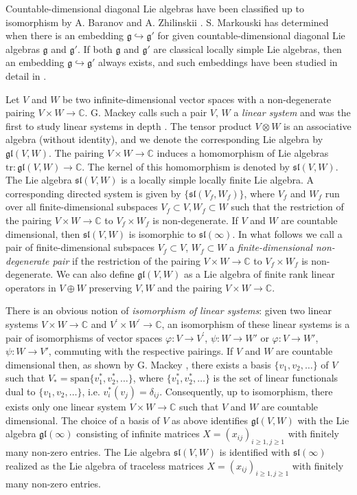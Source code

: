 \documentclass{svmult}
\newcommand {\CC} {\mathbb {C}}
\renewcommand{\sl}{\mathfrak{sl}}
\renewcommand{\gg}{\mathfrak{g}}
\renewcommand {\phi} {\varphi}
\renewcommand{\span}{\mathrm{span}}
\newcommand{\gl}{\mathfrak{gl}}
\begin{document}
Countable-dimensional diagonal Lie algebras have been classified up to
isomorphism by A. Baranov and A. Zhilinskii \cite{BZ}. S. Markouski
\cite{M} has determined when there is an embedding $\gg
\hookrightarrow \gg'$ for given countable-dimensional diagonal Lie
algebras $\gg$ and $\gg'$. If both $\gg$ and $\gg'$ are classical
locally simple Lie algebras, then an embedding 
$\gg \hookrightarrow \gg'$ always exists, and such embeddings have been studied in detail in \cite{dip2}.

Let $V$ and $W$ be two infinite-dimensional vector spaces with a non-degenerate pairing $V \times W \rightarrow \CC$. 
G. Mackey calls such a pair $V,\,W$ a \textit{linear system} and was the first to study linear systems in depth \cite{m}.
The tensor product $V\otimes W$ is an associative algebra (without
identity), and we denote the corresponding Lie algebra by 
$\gl(V,W)$.
The pairing $V\times W\to\CC$ induces a homomorphism of Lie algebras
$\mathrm{tr} : \gl(V,W)\to\CC$. The kernel of this homomorphism is
denoted by $\sl(V,W)$. The Lie algebra $\sl(V,W)$ is a locally simple
locally finite Lie algebra. A corresponding directed system is given
by $\{\sl(V_f,W_f)\}$, where $V_f$ and $W_f$ run over all
finite-dimensional subspaces $V_f\subset V, W_f\subset W$ such that
the restriction of the pairing $V \times W \rightarrow \CC$ to
$V_f\times W_f$ is non-degenerate. If $V$ and $W$ are countable
dimensional, then $\sl(V,W)$ is isomorphic to $\sl(\infty)$. In what
follows we call a pair of finite-dimensional subspaces $V_{f} \subset
V$, $W_{f} \subset W$ a \textit{finite-dimensional non-degenerate
  pair} if the restriction of the pairing $V \times W \rightarrow \CC$
to $V_{f} \times W_{f}$ is non-degenerate. We can also define 
$\gl(V,W)$ as a Lie algebra of finite rank linear operators in
$V\oplus W$ preserving $V,W$ and the pairing $V\times W\to\mathbb C$.

There is an obvious notion of \textit{isomorphism of linear systems}: given two linear systems $V \times W \rightarrow \CC$ and $V^{\prime} \times W^{\prime} \rightarrow \CC$, an isomorphism of these linear systems is a pair of isomorphisms of vector spaces $\phi : V \rightarrow V^{\prime}$, $\psi: W\rightarrow W'$ or $\phi: V \rightarrow W'$, $\psi : W \rightarrow V'$, commuting with the respective pairings. If $V$ and $W$ are countable dimensional then, as shown by G. Mackey \cite{M}, there exists a basis $\lbrace
v_1,v_2,\dots\rbrace$ of $V$ such that 
$V_* = \span \lbrace v^*_1, v^*_2, \dots\rbrace$, 
where $\lbrace v^*_1, v^*_2, \dots\rbrace$ is the set of linear
functionals dual to $\lbrace v_1,v_2,\dots\rbrace$, i.e. $v_i^*(v_j) =
\delta_{ij}$. Consequently, up to isomorphism, there exists only one linear system $V \times W \rightarrow \CC$ such that $V$ and $W$ are countable dimensional. The choice of a basis of $V$ as above identifies $\gl(V,W)$ with
the Lie algebra $\gl(\infty)$ consisting of infinite matrices
$X=(x_{ij})_{i\geq 1,j\geq 1}$ with finitely many non-zero
entries. The Lie algebra $\sl(V,W)$ is identified with 
$\sl(\infty)$ realized as the Lie algebra of traceless matrices 
$X = (x_{ij})_{i \geq 1, j\geq 1}$ with finitely many non-zero entries. 
\end{document}
